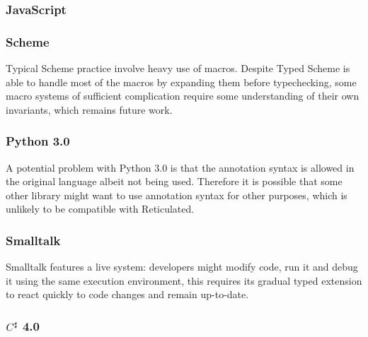 \subsubsection{JavaScript}



\subsubsection{Scheme}

Typical Scheme practice involve heavy use of macros.
Despite Typed Scheme is able to handle most of the macros by expanding them before typechecking,
some macro systems of sufficient complication require some understanding of their own invariants,
which remains future work.

\subsubsection{Python 3.0}

A potential problem with Python 3.0 is that the annotation syntax is allowed in the original language
albeit not being used. Therefore it is possible that some other library might want to use annotation syntax for
other purposes, which is unlikely to be compatible with Reticulated.

\subsubsection{Smalltalk}

Smalltalk features a live system: developers might modify code, run it and debug it using the same execution environment,
this requires its gradual typed extension to react quickly to code changes and remain up-to-date.

\subsubsection{$C^\sharp$ 4.0}

